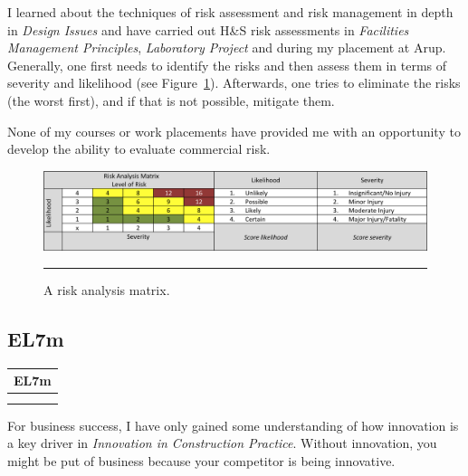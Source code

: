 I learned about the techniques of risk assessment and risk management in depth in \textit{Design Issues} and have carried out H\&S risk assessments in \textit{Facilities Management Principles}, \textit{Laboratory Project} and during my placement at Arup.
Generally, one first needs to identify the risks and then assess them in terms of severity and likelihood (see Figure~\ref{fig:RA_matrix}).
Afterwards, one tries to eliminate the risks (the worst first), and if that is not possible, mitigate them.

None of my courses or work placements have provided me with an opportunity to develop the ability to evaluate commercial risk.


\begin{figure}[htbp]
	\centering
	\includegraphics[width=\textwidth]{figures/RA_matrix.png}
	\rule{\textwidth}{0.5pt} %
	\caption{A risk analysis matrix.}
	\label{fig:RA_matrix}
\end{figure}






\subsection*{EL7m}

\begin{table}
	\begin{tabular}{|ll|}
		\hline
		\multicolumn{2}{|c|}{\cellcolor[HTML]{F8A102}\textbf{EL7m \littlemaster}} \\ \hline
		\ID & \PC \\
		\FMP & \ICP \\ \hline
	\end{tabular}
\end{table}

For business success, I have only gained some understanding of how innovation is a key driver in \textit{Innovation in Construction Practice}.
Without innovation, you might be put of business because your competitor is being innovative.

